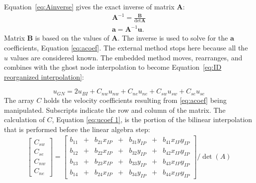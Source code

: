 Equation~\eqref{eq:Ainverse} gives the exact inverse of matrix $\textbf{A}$:
\begin{align}
\textbf{A}^{-1} = \frac{\textbf{B}}{\det{\textbf{A}}}
\label{eq:Ainverse}\\
\textbf{a}=\textbf{A}^{-1}\textbf{u}.\;\label{eq:acoef}
\end{align}
Matrix $\textbf{B}$ is based on the values of $\textbf{A}$. 
The inverse is used to solve for the $\textbf{a}$ coefficients, Equation \eqref{eq:acoef}.
The external method stops here because all the $u$ values are considered known. 
The embedded method moves, rearranges, and combines with the ghost node interpolation to become Equation~\eqref{eq:ID reorganized interpolation}:

\begin{equation}
u_{GN} = 2u_{BI} + C_{nw}u_{nw} + C_{ne}u_{ne} + C_{sw}u_{sw} + C_{se}u_{se}\label{eq:ID reorganized interpolation}
\end{equation}
The array $C$ holds the velocity coefficients resulting from \eqref{eq:acoef} being manipulated. 
Subscripts indicate the row and column of the matrix. 
The calculation of $C$, Equation \eqref{eq:ucoef 1}, is the portion of the bilinear interpolation that is performed before the linear algebra step:
\begin{gather}
	\begin{bmatrix}
		C_{sw}\\
		C_{se}\\
		C_{nw}\\
		C_{ne}
	\end{bmatrix}
=
	\begin{bmatrix}
		b_{11}&+&b_{21}x_{IP}&+&b_{31}y_{IP}&+&b_{41}x_{IP}y_{IP}\\
		b_{12}&+&b_{22}x_{IP}&+&b_{32}y_{IP}&+&b_{42}x_{IP}y_{IP}\\
		b_{13}&+&b_{23}x_{IP}&+&b_{33}y_{IP}&+&b_{43}x_{IP}y_{IP}\\
		b_{14}&+&b_{24}x_{IP}&+&b_{34}y_{IP}&+&b_{44}x_{IP}y_{IP}
	\end{bmatrix}
	/\det{(A)}
\label{eq:ucoef 1}
\end{gather}


